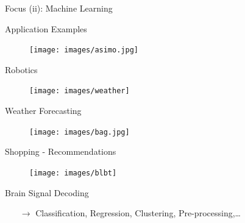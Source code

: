 \begin{frame}[c,fragile]{Focus (ii): Machine Learning}

\begin{block}{Application Examples}
\centering
\begin{multicols}{2}

\begin{figure}
\texttt{[image: images/asimo.jpg]}
\end{figure}
\vspace{-1.3em}
Robotics

\begin{figure}
\texttt{[image: images/weather]}
\end{figure}
\vspace{-1.3em}
Weather Forecasting

\columnbreak

\begin{figure}
\texttt{[image: images/bag.jpg]}
\end{figure}
\vspace{-1.3em}
Shopping - Recommendations

\begin{figure}
\texttt{[image: images/blbt]}
\end{figure}
\vspace{-1.3em}
Brain Signal Decoding
\end{multicols}
\end{block}

\pause

\begin{itemize}
  \item[$\to$] Classification, Regression, Clustering, Pre-processing,\ldots
\end{itemize}

\end{frame}
